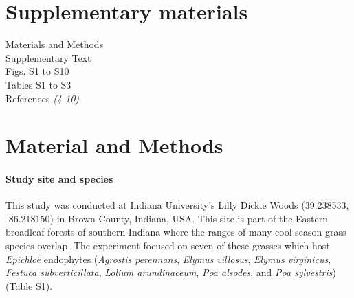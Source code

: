 \documentclass[12pt]{article}
\begin{document}
\section*{Supplementary materials}
Materials and Methods\\
Supplementary Text\\


Figs. S1 to S10\\
Tables S1 to S3\\
References \textit{(4-10)}


\section*{Material and Methods}
\paragraph*{Study site and species}
This study was conducted at Indiana University's Lilly Dickie Woods (39.238533, -86.218150) in Brown County, Indiana, USA. 
This site is part of the Eastern broadleaf forests of southern Indiana where the ranges of many cool-season grass species overlap. 
The experiment focused on seven of these grasses which host \emph{Epichlo\"e} endophytes (\emph{Agrostis perennans}, \emph{Elymus villosus}, \emph{Elymus virginicus}, \emph{Festuca subverticillata}, \emph{Lolium arundinaceum}, \emph{Poa alsodes}, and \emph{Poa sylvestris}) (Table S1). 
\end{document}
